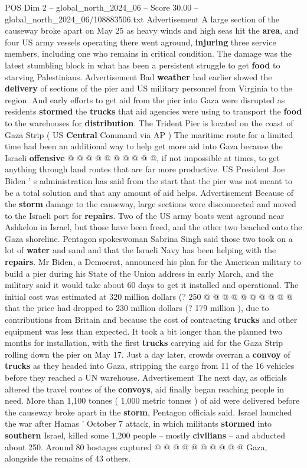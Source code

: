 \begin{textsample}{POS Dim 2 – global\_north\_2024\_06 – Score 30.00 – global\_north\_2024\_06/108883506.txt}
Advertisement A large section of the causeway broke apart on May 25 as heavy winds and high seas hit the \textbf{area}, and four US army vessels operating there went aground, \textbf{injuring} three service members, including one who remains in critical condition.
The damage was the latest stumbling block in what has been a persistent struggle to get \textbf{food} to starving Palestinians.
Advertisement Bad \textbf{weather} had earlier slowed the \textbf{delivery} of sections of the pier and US military personnel from Virginia to the region.
And early efforts to get aid from the pier into Gaza were disrupted as residents \textbf{stormed} the \textbf{trucks} that aid agencies were using to transport the \textbf{food} to the warehouses for \textbf{distribution}.
The Trident Pier is located on the coast of Gaza Strip ( US \textbf{Central} Command via AP ) The maritime route for a limited time had been an additional way to help get more aid into Gaza because the Israeli \textbf{offensive} @ @ @ @ @ @ @ @ @ @, if not impossible at times, to get anything through land routes that are far more productive.
US President Joe Biden ' s administration has said from the start that the pier was not meant to be a total solution and that any amount of aid helps.
Advertisement Because of the \textbf{storm} damage to the causeway, large sections were disconnected and moved to the Israeli port for \textbf{repairs}.
Two of the US army boats went aground near Ashkelon in Israel, but those have been freed, and the other two beached onto the Gaza shoreline.
Pentagon spokeswoman Sabrina Singh said those two took on a lot of \textbf{water} and sand and that the Israeli Navy has been helping with the \textbf{repairs}.
Mr Biden, a Democrat, announced his plan for the American military to build a pier during his State of the Union address in early March, and the military said it would take about 60 days to get it installed and operational.
The initial cost was estimated at 320 million dollars (? 250 @ @ @ @ @ @ @ @ @ @ that the price had dropped to 230 million dollars (? 179 million ), due to contributions from Britain and because the cost of contracting \textbf{trucks} and other equipment was less than expected.
It took a bit longer than the planned two months for installation, with the first \textbf{trucks} carrying aid for the Gaza Strip rolling down the pier on May 17.
Just a day later, crowds overran a \textbf{convoy} of \textbf{trucks} as they headed into Gaza, stripping the cargo from 11 of the 16 vehicles before they reached a UN warehouse.
Advertisement The next day, as officials altered the travel routes of the \textbf{convoys}, aid finally began reaching people in need.
More than 1,100 tonnes ( 1,000 metric tonnes ) of aid were delivered before the causeway broke apart in the \textbf{storm}, Pentagon officials said.
Israel launched the war after Hamas ' October 7 attack, in which militants \textbf{stormed} into \textbf{southern} Israel, killed some 1,200 people -- mostly \textbf{civilians} -- and abducted about 250.
Around 80 hostages captured @ @ @ @ @ @ @ @ @ @ Gaza, alongside the remains of 43 others.


\end{textsample}
